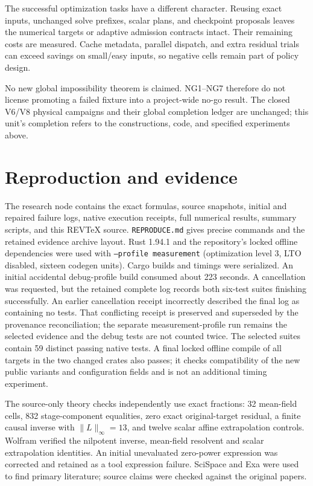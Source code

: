 \documentclass[aps,pra,reprint,onecolumn,12pt,notitlepage,superscriptaddress,nofootinbib]{revtex4-2}
\begin{document}
The successful optimization tasks have a different character. Reusing exact
inputs, unchanged solve prefixes, scalar plans, and checkpoint proposals
leaves the numerical targets or adaptive admission contracts intact.
Their remaining costs are measured. Cache metadata, parallel dispatch, and
extra residual trials can exceed savings on small/easy inputs, so negative
cells remain part of policy design.

No new global impossibility theorem is claimed. NG1--NG7 therefore do not
license promoting a failed fixture into a project-wide no-go result.
The closed V6/V8 physical campaigns and their global completion ledger are
unchanged; this unit's completion refers to the constructions, code, and
specified experiments above.

\section{Reproduction and evidence}
The research node contains the exact formulas, source snapshots, initial
and repaired failure logs, native execution receipts, full numerical
results, summary scripts, and this REVTeX source.
\texttt{REPRODUCE.md} gives precise commands and the retained evidence
archive layout. Rust 1.94.1 and the repository's locked offline dependencies
were used with \texttt{--profile measurement} (optimization level 3,
LTO disabled, sixteen codegen units). Cargo builds and timings were serialized.
An initial accidental debug-profile build consumed about 223 seconds.
A cancellation was requested, but the retained complete log records both
six-test suites finishing successfully. An earlier cancellation receipt
incorrectly described the final log as containing no tests. That conflicting
receipt is preserved and superseded by the provenance reconciliation; the
separate measurement-profile run remains the selected evidence and the debug
tests are not counted twice. The selected suites contain 59 distinct passing
native tests. A final locked offline compile of all targets in the two changed
crates also passes; it checks compatibility of the new public variants and
configuration fields and is not an additional timing experiment.

The source-only theory checks independently use exact fractions: 32
mean-field cells, 832 stage-component equalities, zero exact original-target
residual, a finite causal inverse with $\|L\|_\infty=13$, and twelve scalar
affine extrapolation controls. Wolfram verified the nilpotent inverse,
mean-field resolvent and scalar extrapolation identities. An initial
unevaluated zero-power expression was corrected and retained as a tool
expression failure. SciSpace and Exa were used to find primary literature;
source claims were checked against the original papers.
\end{document}
